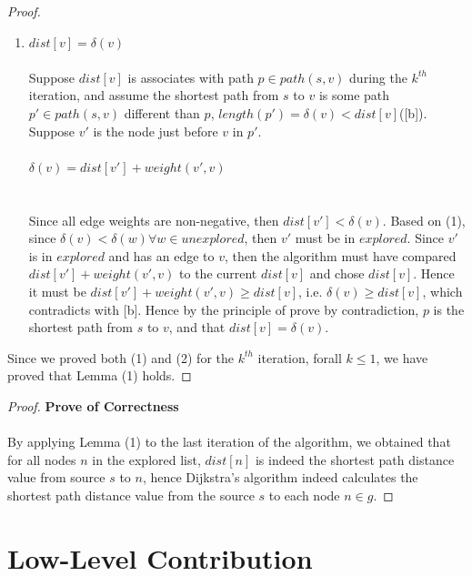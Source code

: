 \documentclass[11pt, a4paper]{article} %
\theoremstyle{definition}
\newcommand\ftab[1][5cm]{\hspace*{#1}}
\begin{document}
\begin{proof}
\begin{enumerate}
(Proof below are still under construction)
\item $dist[v] = \delta(v)$
\\\\
Suppose $dist[v]$ is associates with path $p \in path(s, v)$ during the $k^{th}$ iteration, and assume the shortest path from $s$ to $v$ is some path $p' \in path(s, v)$ different than $p$, $length(p') = \delta(v) < dist[v]$([b]). Suppose $v'$ is the node just before $v$ in $p'$. 
\\\\
\ftab $\delta(v) = dist[v'] + weight(v', v)$ \\
\\\\
Since all edge weights are non-negative, then $dist[v'] < \delta(v)$. Based on (1), since $\delta(v) < \delta(w) \forall w \in unexplored$, then $v'$ must be in $explored$. Since $v'$ is in $explored$ and has an edge to $v$, then the algorithm must have compared $dist[v'] + weight(v', v)$ to the current $dist[v]$ and chose $dist[v]$. Hence it must be $dist[v'] + weight(v', v) \geq dist[v]$, i.e. $\delta(v) \geq dist[v]$, which contradicts with [b]. Hence by the principle of prove by contradiction, $p$ is the shortest path from $s$ to $v$, and that $dist[v] = \delta(v)$. 
\end{enumerate}
Since we proved both (1) and (2) for the $k^{th}$ iteration, forall $k \leq 1$, we have proved that Lemma (1) holds.
\end{proof}

\begin{proof}\textbf{Prove of Correctness}
\\\\
By applying Lemma (1) to the last iteration of the algorithm, we obtained that for all nodes $n$ in the explored list, $dist[n]$ is indeed the shortest path distance value from source $s$ to $n$, hence Dijkstra's algorithm indeed calculates the shortest path distance value from the source $s$ to each node $n \in g$. 
\end{proof}


\section{Low-Level Contribution}
\end{document}
